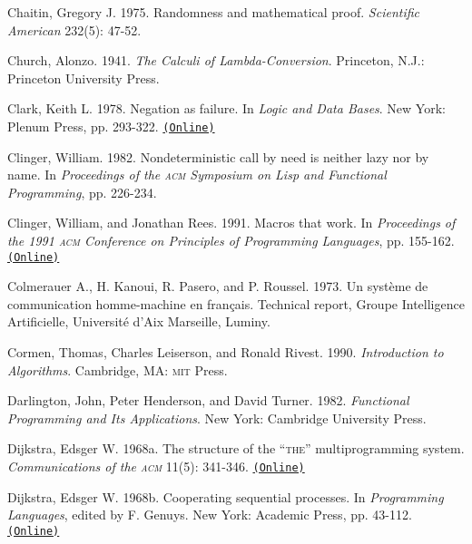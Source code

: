 \documentclass[oneside]{book}
\newcommand{\acronym}[1]{\textsc{\MakeLowercase{#1}}}
\newcommand{\code}[1]{\texttt{#1}}
\begin{document}
 \label{Chaitin 1975}
Chaitin, Gregory J.  1975.  Randomness and mathematical proof.
\textit{Scientific American} 232(5): 47-52.

 \label{Church (1941)}
Church, Alonzo.  1941.  \textit{The Calculi of Lambda-Conversion}.  Princeton,
N.J.: Princeton University Press.

 \label{Clark (1978)}
Clark, Keith L.  1978.  Negation as failure.  In \textit{Logic and Data Bases}.
New York: Plenum Press, pp. 293-322.
\href{http://www.doc.ic.ac.uk/~klc/neg.html}{\code{(Online)}}

 \label{Clinger (1982)}
Clinger, William.  1982.  Nondeterministic call by need is neither lazy nor by
name. In \textit{Proceedings of the \acronym{ACM} Symposium on Lisp and
Functional Programming}, pp. 226-234.

 \label{Clinger and Rees 1991}
Clinger, William, and Jonathan Rees.  1991.  Macros that work.  In
\textit{Proceedings of the 1991 \acronym{ACM} Conference on Principles of
Programming Languages}, pp. 155-162.
\href{http://mumble.net/~jar/pubs/macros_that_work.ps}{\code{(Online)}}

 \label{Colmerauer et al. 1973}
Colmerauer A., H. Kanoui, R. Pasero, and P. Roussel.  1973.  Un syst\`eme de
communication homme-machine en fran\c{c}ais.  Technical report, Groupe
Intelligence Artificielle, Universit\'e d'Aix Marseille, Luminy.

 \label{Cormen et al. 1990}
Cormen, Thomas, Charles Leiserson, and Ronald Rivest.  1990. \textit{Introduction
to Algorithms}. Cambridge, MA: \acronym{MIT} Press.

 \label{Darlington et al. 1982}
Darlington, John, Peter Henderson, and David Turner.  1982.  \textit{Functional
Programming and Its Applications}. New York: Cambridge University Press.

 \label{Dijkstra 1968a}
Dijkstra, Edsger W. 1968a.  The structure of the ``\acronym{THE}''
multiprogramming system.  \textit{Communications of the \acronym{ACM}}
11(5): 341-346.
\href{http://www.cs.utexas.edu/users/EWD/ewd01xx/EWD196.PDF}{\code{(Online)}}

 \label{Dijkstra 1968b}
Dijkstra, Edsger W. 1968b.  Cooperating sequential processes.  In
\textit{Programming Languages}, edited by F. Genuys. New York: Academic Press,
pp.  43-112.
\href{http://www.cs.utexas.edu/users/EWD/ewd01xx/EWD123.PDF}{\code{(Online)}}
\end{document}
